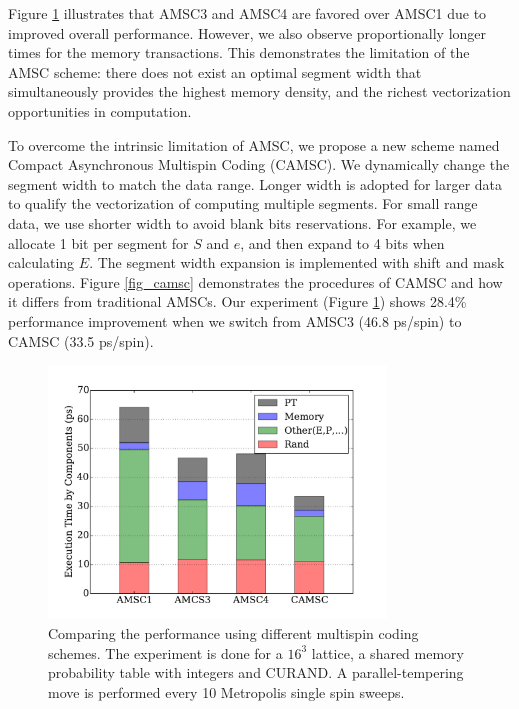 Figure \ref{fig_msc_perf} illustrates that AMSC3 and AMSC4 are favored over AMSC1 due to improved 
overall performance.  However, we also observe proportionally longer times for
the memory transactions. %
This demonstrates the limitation of the AMSC scheme: there does not exist an optimal segment width
that simultaneously provides the highest memory density, and the richest vectorization opportunities in computation.


To overcome the intrinsic limitation of AMSC, we propose a new scheme named Compact Asynchronous Multispin 
Coding (CAMSC).  We dynamically change the segment width to match the data range. %
Longer width is adopted for larger data to qualify the vectorization of computing multiple segments. 
For small range data, we use shorter width to avoid blank bits reservations. 
For example, we allocate 1 bit per segment for $S$ and $e$, and then expand to 4 bits when calculating $E$. 
The segment width expansion is implemented with shift and mask operations. 
Figure \ref{fig_camsc} demonstrates the procedures of CAMSC and how it differs from traditional AMSCs.
Our experiment (Figure \ref{fig_msc_perf}) shows 28.4\% performance improvement 
when we switch from AMSC3 (46.8 ps/spin) to CAMSC (33.5 ps/spin).



\begin{figure}[!h]
  \centering
  \includegraphics[width=0.8\textwidth]{img/percentage3b.pdf}
  \caption{Comparing the performance using different multispin coding schemes. The experiment 
is done for a $16^3$ lattice, a shared memory probability table with integers and CURAND.
A parallel-tempering move is performed every 10 Metropolis single spin sweeps.}
  \label{fig_msc_perf}
\end{figure}







